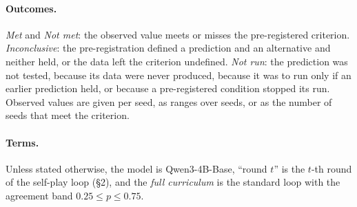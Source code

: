 \documentclass[10pt,a4paper]{article}
\begin{document}
\paragraph{Outcomes.} \emph{Met} and \emph{Not met}: the observed value meets or misses the pre-registered criterion. \emph{Inconclusive}: the pre-registration defined a prediction and an alternative and neither held, or the data left the criterion undefined. \emph{Not run}: the prediction was not tested, because its data were never produced, because it was to run only if an earlier prediction held, or because a pre-registered condition stopped its run. Observed values are given per seed, as ranges over seeds, or as the number of seeds that meet the criterion.

\paragraph{Terms.} Unless stated otherwise, the model is Qwen3-4B-Base, ``round $t$'' is the $t$-th round of the self-play loop (\S2), and the \emph{full curriculum} is the standard loop with the agreement band $0.25 \le p \le 0.75$.
\end{document}
